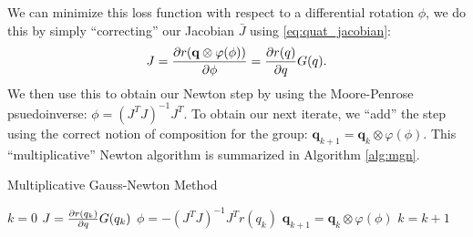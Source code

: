 \documentclass[letterpaper, 10 pt, conference]{ieeeconf}  %
\newcommand{\R}{\mathbb{R}}
\newcommand{\q}{\textbf{q}}
\begin{document}

    
    We can minimize this loss function with respect to a differential rotation $\phi$,
    we do this by simply ``correcting'' our Jacobian $\bar{J}$ using 
    \eqref{eq:quat_jacobian}:
    \begin{equation} 
        {J} = \pdv{r(\mathbf{q} \otimes \varphi(\phi))}{\phi} = \pdv{r(q)}{q} G(q).
    \end{equation}
    We then use this to obtain our Newton step by using the Moore-Penrose psuedoinverse:
    $\phi = ({J}^T {J})^{-1} {J}^T$. To obtain our next iterate, we ``add'' the
    step using the correct notion of composition for the group: 
    $\q_{k+1} = \q_k \otimes \varphi(\phi)$. This ``multiplicative'' Newton algorithm is 
    summarized in Algorithm \ref{alg:mgn}.

    \begin{algorithm} 
    	\begin{algorithmic}[1]
    		\caption{Multiplicative Gauss-Newton Method}\label{alg:mgn}
    		\State $k = 0$
    		    \State ${J} = \pdv{r(q_k)}{q} G(q_k)$ 
    		    \State $ \phi = -({J}^T {J})^{-1} {J}^T r(q_k)$ 
    		    \State $\q_{k+1} = \q_k \otimes \varphi(\phi)$ 
    		    \State $k = k + 1$
    		\EndWhile
    	\end{algorithmic}
    \end{algorithm}
\end{document}

